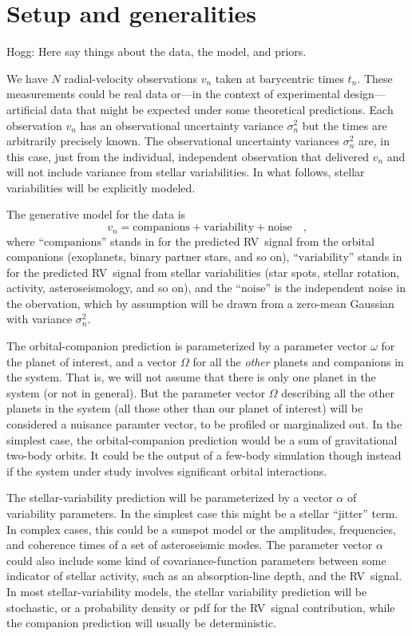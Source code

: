 \documentclass[modern]{aastex63}
\newcommand{\acronym}[1]{{\small{#1}}}
\newcommand{\rv}{\acronym{RV}}
\begin{document}
\section{Setup and generalities}

Hogg: Here say things about the data, the model, and priors.

We have $N$ radial-velocity observations $v_n$ taken at barycentric times
$t_n$.
These measurements could be real data or---in the context of experimental
design---artificial data that might be expected under some theoretical
predictions.
Each observation $v_n$ has an observational uncertainty variance
$\sigma^2_n$ but the times are arbitrarily precisely known.
The observational uncertainty variances $\sigma^2_n$ are, in this case,
just from the individual, independent observation that delivered $v_n$
and will not include variance from stellar variabilities.
In what follows, stellar variabilities will be explicitly modeled.

The generative model for the data is
\begin{equation}
  v_n = \mbox{companions} + \mbox{variability} + \mbox{noise}
  \quad ,
\end{equation}
where ``$\mbox{companions}$'' stands in for the predicted \rv\ signal
from the orbital companions (exoplanets, binary partner stars, and so
on),
``$\mbox{variability}$'' stands in for the predicted \rv\ signal from
stellar variabilities (star spots, stellar rotation, activity,
asteroseismology, and so on),
and
the ``$\mbox{noise}$'' is the independent noise in the obervation,
which by assumption will be drawn from a zero-mean Gaussian with
variance $\sigma^2_n$.

The orbital-companion prediction is parameterized by a parameter
vector $\omega$ for the planet of interest, and a vector $\Omega$ for
all the \emph{other} planets and companions in the system.
That is, we will not assume that there is only one planet in the
system (or not in general).
But the parameter vector $\Omega$ describing all the other planets in
the system (all those other than our planet of interest) will be
considered a nuisance paramter vector, to be profiled or marginalized
out.
In the simplest case, the orbital-companion prediction would be a sum
of gravitational two-body orbits.
It could be the output of a few-body simulation though instead if the
system under study involves significant orbital interactions.

The stellar-variability prediction will be parameterized by a vector
$\alpha$ of variability parameters.
In the simplest case this might be a stellar ``jitter'' term.
In complex cases, this could be a sunspot model or the amplitudes,
frequencies, and coherence times of a set of asteroseismic modes.
The parameter vector $\alpha$ could also include some kind of
covariance-function parameters between some indicator of stellar
activity, such as an absorption-line depth, and the \rv\ signal.
In most stellar-variability models, the stellar variability prediction
will be stochastic, or a probability density or pdf for the \rv\
signal contribution, while the companion prediction will usually be
deterministic.
\end{document}
